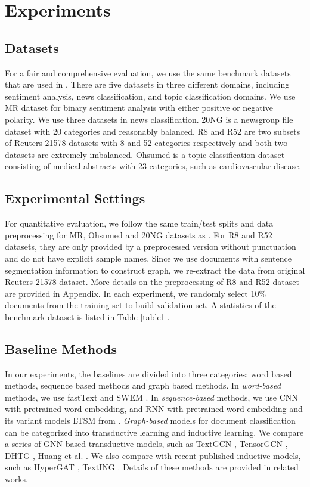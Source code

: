 \documentclass[letterpaper]{article} %
\begin{document}
\section{Experiments}
\subsection{Datasets}
For a fair and comprehensive evaluation, we use the same benchmark datasets that are used in \cite{yao2019graph}. There are five datasets in three different domains, including sentiment analysis, news classification, and topic classification domains. We use MR dataset for binary sentiment analysis with either positive or negative polarity. We use three datasets in news classification. 20NG is a newsgroup file dataset with 20 categories and reasonably balanced. R8 and R52 are two subsets of Reuters 21578 \cite{Reuters} datasets with 8 and 52 categories respectively and both two datasets are extremely imbalanced. Ohsumed is a topic classification dataset consisting of medical abstracts with 23 categories, such as cardiovascular disease.
\subsection{Experimental Settings}
For quantitative evaluation, we follow the same train/test splits and data preprocessing for MR, Ohsumed and 20NG datasets as \cite{kim-2014-convolutional,yao2019graph}. For R8 and R52 datasets, they are only provided by a preprocessed version without punctuation and do not have explicit sample names. Since we use documents with sentence segmentation information to construct graph, we re-extract the data from original Reuters-21578 dataset.
More details on the preprocessing of R8 and R52 dataset are provided in Appendix.
In each experiment, we randomly select 10\% documents from the training set to build validation set.
A statistics of the benchmark dataset is listed in Table \ref{table1}.


\subsection{Baseline Methods}
In our experiments, the baselines are divided into three categories: word based methods, sequence based methods and graph based methods. In \textit{word-based} methods, we use fastText \cite{joulin2017bag} and SWEM \cite{shen2018baseline}.
In \textit{sequence-based} methods, we use CNN \cite{kim-2014-convolutional} with pretrained word embedding, and RNN \cite{liu2016recurrent} with pretrained word embedding and its variant models LTSM from \cite{yao2019graph}. \textit{Graph-based} models for document classification can be categorized into transductive learning and inductive learning. We compare a series of GNN-based transductive models, such as TextGCN \cite{yao2019graph}, TensorGCN  \cite{liu2020tensor}, DHTG \cite{wang2020learning}, Huang et al. \cite{huang2019text}. We also compare with recent published inductive models, such as HyperGAT \cite{ding2020more}, TextING \cite{zhang2020every}. Details of these methods are provided in related works.
\end{document}
